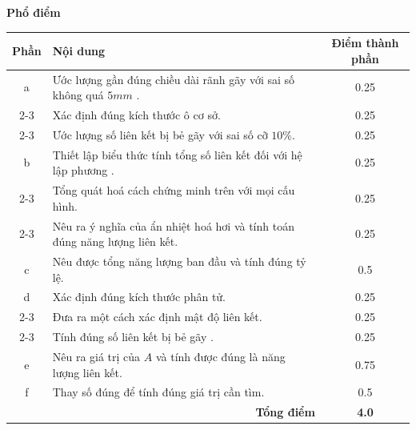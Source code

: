 \noindent \textbf{\large Phổ điểm}
\begin{center}
\renewcommand{\arraystretch}{1.5}
\begin{tabularx}{\textwidth}{|c|X|c|}
\hline
\textbf{Phần} & \textbf{Nội dung} & \textbf{Điểm thành phần} \\ \hline
a &Ước lượng gần đúng chiều dài rãnh gãy với sai số không quá $5mm$ . & 0.25 \\ \cline{2-3} 
&Xác định đúng kích thước ô cơ sở. & 0.25 \\ \cline{2-3} 
 & Ước lượng số liên kết bị bẻ gãy với sai số cỡ $10\%$. & 0.25 \\ \hline
b &Thiết lập biểu thức tính tổng số liên kết đối với hệ lập phương . & 0.25 \\ \cline{2-3} 
&Tổng quát hoá cách chứng minh trên với mọi cấu hình. & 0.25 \\ \cline{2-3} 
 & Nêu ra ý nghĩa của ẩn nhiệt hoá hơi và tính toán đúng năng lượng liên kết. & 0.25 \\ \hline
c & Nêu được tổng năng lượng ban đầu và tính đúng tỷ lệ. & 0.5 \\ \hline
d &Xác định đúng kích thước phân tử. & 0.25 \\ \cline{2-3} 
&Đưa ra một cách xác định mật độ liên kết. & 0.25\\ \cline{2-3} 
 &Tính đúng số liên kết bị bẻ gãy . & 0.25 \\ \hline
 e & Nêu ra giá trị của $A$ và tính được đúng là năng lượng liên kết. & 0.75 \\ \hline
f & Thay số đúng để tính đúng giá trị cần tìm. & 0.5 \\ \hline
\multicolumn{2}{|r|}{\textbf{Tổng điểm}} & \textbf{4.0} \\ \hline
\end{tabularx}
\end{center}